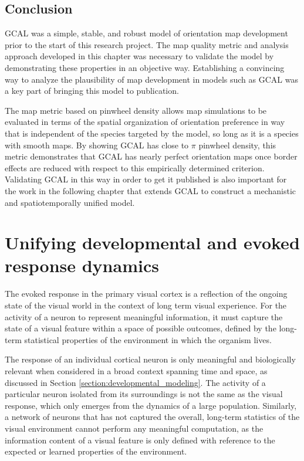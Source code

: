 \documentclass[phd,ianc,twoside]{infthesis}
\begin{document}
\section{Conclusion}

GCAL was a simple, stable, and robust model of orientation map
development prior to the start of this research project. The map quality
metric and analysis approach developed in this chapter was necessary to
validate the model by demonstrating these properties in an objective
way. Establishing a convincing way to analyze the plausibility of map
development in models such as GCAL was a key part of bringing this model
to publication.

The map metric based on pinwheel density allows map simulations to be
evaluated in terms of the spatial organization of orientation preference
in way that is independent of the species targeted by the model, so long
as it is a species with smooth maps. By showing GCAL has close to
$\pi$ pinwheel density, this metric demonstrates that GCAL has nearly
perfect orientation maps once border effects are reduced with respect
to this empirically determined criterion. Validating GCAL in this way in
order to get it published is also important for the work in the
following chapter that extends GCAL to construct a mechanistic and
spatiotemporally unified model.



\chapter{Unifying developmental and evoked response dynamics}
\label{chapter:TCAL}

The evoked response in the primary visual cortex is a reflection of the
ongoing state of the visual world in the context of long term visual
experience. For the activity of a neuron to represent meaningful
information, it must capture the state of a visual feature within a
space of possible outcomes, defined by the long-term statistical
properties of the environment in which the organism lives.

The response of an individual cortical neuron is only meaningful and
biologically relevant when considered in a broad context spanning time
and space, as discussed in Section
\ref{section:developmental_modeling}. The activity of a particular
neuron isolated from its surroundings is not the same as the visual response,
which only emerges from the dynamics of a large population. Similarly, a
network of neurons that has not captured the overall, long-term
statistics of the visual environment cannot perform any meaningful
computation, as the information content of a visual feature is only
defined with reference to the expected or learned properties of the
environment. 
\end{document}
